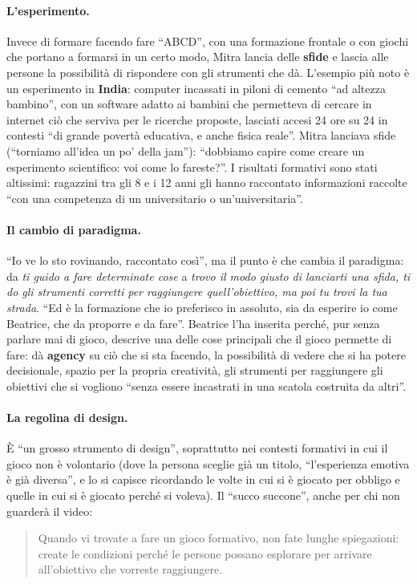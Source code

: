 \paragraph{L'esperimento.} Invece di formare facendo fare ``ABCD'', con una formazione
frontale o con giochi che portano a formarsi in un certo modo, Mitra lancia delle
\textbf{sfide} e lascia alle persone la possibilità di rispondere con gli strumenti
che dà. L'esempio più noto è un esperimento in \textbf{India}: computer incassati in
piloni di cemento ``ad altezza bambino'', con un software adatto ai bambini che
permetteva di cercare in internet ciò che serviva per le ricerche proposte, lasciati
accesi 24 ore su 24 in contesti ``di grande povertà educativa, e anche fisica reale''.
Mitra lanciava sfide (``torniamo all'idea un po' della jam''): ``dobbiamo capire come
creare un esperimento scientifico: voi come lo fareste?''. I risultati formativi sono
stati altissimi: ragazzini tra gli 8 e i 12 anni gli hanno raccontato informazioni
raccolte ``con una competenza di un universitario o un'universitaria''.

\paragraph{Il cambio di paradigma.} ``Io ve lo sto rovinando, raccontato così'', ma il
punto è che cambia il paradigma: da \emph{ti guido a fare determinate cose} a
\emph{trovo il modo giusto di lanciarti una sfida, ti do gli strumenti corretti per
raggiungere quell'obiettivo, ma poi tu trovi la tua strada}. ``Ed è la formazione che
io preferisco in assoluto, sia da esperire io come Beatrice, che da proporre e da
fare''. Beatrice l'ha inserita perché, pur senza parlare mai di gioco, descrive una
delle cose principali che il gioco permette di fare: dà \textbf{agency} su ciò che si
sta facendo, la possibilità di vedere che si ha potere decisionale, spazio per la
propria creatività, gli strumenti per raggiungere gli obiettivi che si vogliono
``senza essere incastrati in una scatola costruita da altri''.

\paragraph{La regolina di design.} È ``un grosso strumento di design'', soprattutto
nei contesti formativi in cui il gioco non è volontario (dove la persona sceglie già un
titolo, ``l'esperienza emotiva è già diversa'', e lo si capisce ricordando le volte in
cui si è giocato per obbligo e quelle in cui si è giocato perché si voleva). Il
``succo succone'', anche per chi non guarderà il video:
\begin{quote}
Quando vi trovate a fare un gioco formativo, non fate lunghe spiegazioni: create le
condizioni perché le persone possano esplorare per arrivare all'obiettivo che vorreste
raggiungere.
\end{quote}

